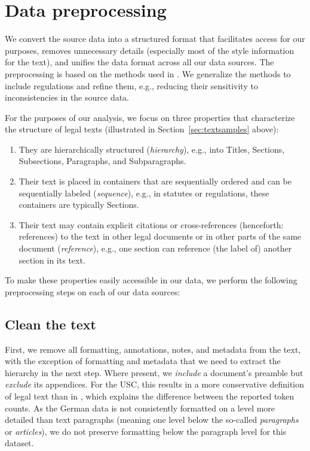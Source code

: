 \documentclass[utf8,sort&compress,numbers,square,table,hidelinks]{frontiers_suppmat} %
\begin{document}

\clearpage

\section{Data preprocessing}

We convert the source data into a structured format that facilitates access for our purposes, 
removes unnecessary details (especially most of the style information for the text),
and unifies the data format across all our data sources.
The preprocessing is based on the methods used in \cite{katz2020}. 
We generalize the methods to include regulations and refine them, e.g., reducing their sensitivity to inconsistencies in the source data.

For the purposes of our analysis,
we focus on three properties that characterize the structure of legal texts (illustrated in Section~\ref{sec:textsamples} above):

\begin{enumerate}
	\item They are hierarchically structured (\emph{hierarchy}), 
	e.g., into Titles, Sections, Subsections, Paragraphs, and Subparagraphs.
	\item Their text is placed in containers that are sequentially ordered and can be sequentially labeled (\emph{sequence}),
	e.g., in statutes or regulations, these containers are typically Sections.
	\item Their text may contain explicit citations or cross-references (henceforth: references) to the text in other legal documents or in other parts of the same document (\emph{reference}),
	e.g., one section can reference (the label of) another section in its text.
\end{enumerate}

To make these properties easily accessible in our data, 
we perform the following preprocessing steps on each of our data sources:

\vspace*{6pt}
\subsection{Clean the text}

First, we remove all formatting, annotations, notes, and metadata from the text, 
with the exception of formatting and metadata that we need to extract the hierarchy in the next step. 
Where present, we \emph{include} a document's preamble but \emph{exclude} its appendices.
For the USC, this results in a more conservative definition of legal text than in \cite{bommarito2010}, 
which explains the difference between the reported token counts.
As the German data is not consistently formatted on a level more detailed than text paragraphs (meaning one level below the so-called \emph{paragraphs} or \emph{articles}), we do not preserve formatting below the paragraph level for this dataset.
\end{document}
